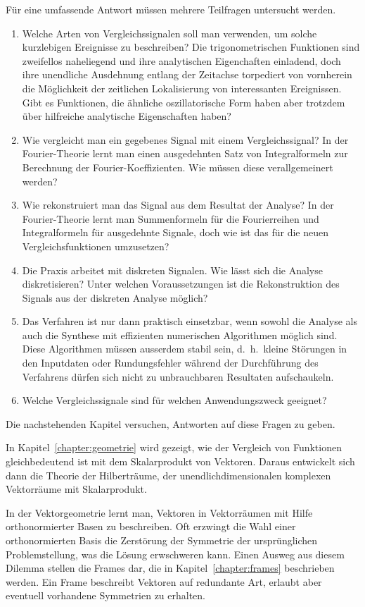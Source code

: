 Für eine umfassende Antwort müssen mehrere Teilfragen untersucht werden.
\begin{enumerate}
\item
Welche Arten von Vergleichssignalen soll man verwenden, um solche kurzlebigen
Ereignisse zu beschreiben?
Die trigonometrischen Funktionen sind zweifellos naheliegend und ihre
analytischen Eigenchaften einladend, doch ihre unendliche Ausdehnung entlang
der Zeitachse torpediert von vornherein die Möglichkeit der zeitlichen
Lokalisierung von interessanten Ereignissen.
Gibt es Funktionen, die ähnliche oszillatorische Form haben
aber trotzdem über hilfreiche analytische Eigenschaften haben?
\item
Wie vergleicht man ein gegebenes Signal mit einem Vergleichssignal?
In der Fourier-Theorie lernt man einen ausgedehnten Satz von Integralformeln
zur Berechnung der Fourier-Koeffizien\-ten.
Wie müssen diese verallgemeinert werden?
\item
Wie rekonstruiert man das Signal aus dem Resultat der Analyse?
In der Fourier-Theorie lernt man Summenformeln für die Fourierreihen
und Integralformeln für ausgedehnte Signale, doch wie ist das für 
die neuen Vergleichsfunktionen umzusetzen?
\item
Die Praxis arbeitet mit diskreten Signalen. 
Wie lässt sich die Analyse diskretisieren?
Unter welchen Voraussetzungen ist die Rekonstruktion des Signals
aus der diskreten Analyse möglich?
\item
Das Verfahren ist nur dann praktisch einsetzbar, wenn sowohl die Analyse als
auch die Synthese mit effizienten numerischen Algorithmen möglich sind.
Diese Algorithmen müssen ausserdem stabil sein, d.~h.~kleine Störungen in
den Inputdaten oder Rundungsfehler während der Durchführung des Verfahrens
dürfen sich nicht zu unbrauchbaren Resultaten aufschaukeln.
\item
Welche Vergleichssignale sind für welchen Anwendungszweck geeignet?
\end{enumerate}
Die nachstehenden Kapitel versuchen, Antworten auf diese Fragen zu
geben.

In Kapitel~\ref{chapter:geometrie} wird gezeigt, wie der Vergleich
von Funktionen gleichbedeutend ist mit dem Skalarprodukt von Vektoren.
Daraus entwickelt sich dann die Theorie der Hilberträume, der
%
unendlichdimensionalen komplexen Vektorräume mit Skalarprodukt.

In der Vektorgeometrie lernt man, Vektoren in Vektorräumen mit Hilfe
orthonormierter Basen zu beschreiben.
Oft erzwingt die Wahl einer orthonormierten Basis die Zerstörung
der Symmetrie der ursprünglichen Problemstellung, was die Lösung
erwschweren kann.
Einen Ausweg aus diesem Dilemma stellen die Frames dar, die in
Kapitel~\ref{chapter:frames} beschrieben werden.
%
Ein Frame beschreibt Vektoren auf redundante Art, erlaubt aber eventuell
vorhandene Symmetrien zu erhalten.

